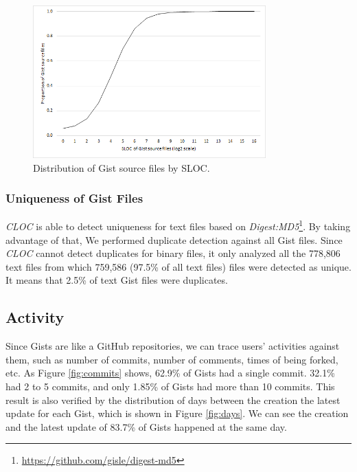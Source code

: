 \begin{figure}[!htb]
	\centering
	\includegraphics[width=0.8\textwidth]{figures/sloc.png}
	\caption{Distribution of Gist source files by SLOC.}
	\label{fig:sloc}
\end{figure}

\subsubsection{Uniqueness of Gist Files}
\textit{CLOC} is able to detect uniqueness for text files based on \textit{Digest:MD5}\footnote{\url{https://github.com/gisle/digest-md5}}. By taking advantage of that, We performed duplicate detection against all Gist files. Since \textit{CLOC} cannot detect duplicates for binary files, it only analyzed all the 778,806 text files from which 759,586 (97.5\% of all text files) files were detected as unique. It means that 2.5\% of text Gist files were duplicates.

\subsection{Activity}
Since Gists are like a GitHub repositories, we can trace users' activities against them, such as number of commits, number of comments, times of being forked, etc. As Figure \ref{fig:commits} shows, 62.9\% of Gists had a single commit. 32.1\% had 2 to 5 commits, and only 1.85\% of Gists had more than 10 commits. This result is also verified by the distribution of days between the creation the latest update for each Gist, which is shown in Figure \ref{fig:days}. We can see the creation and the latest update of 83.7\% of Gists happened at the same day. 

